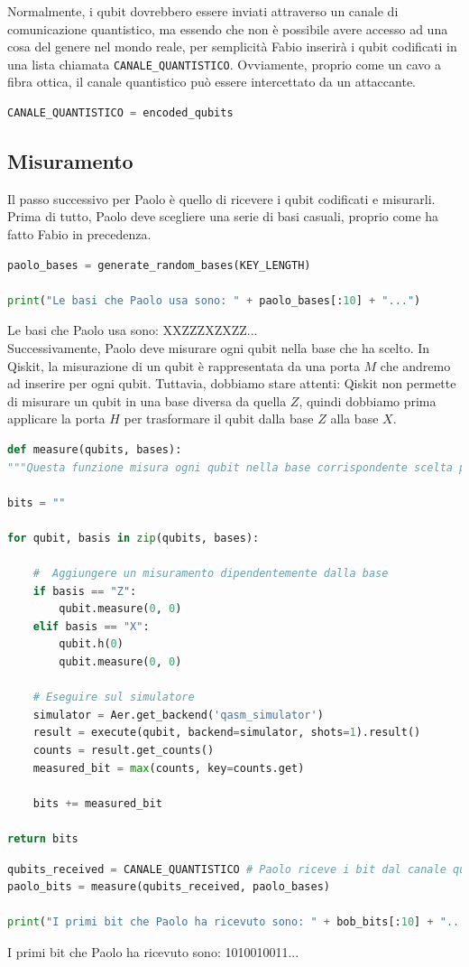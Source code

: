 \documentclass[a4paper]{article}
\begin{document}
Normalmente, i qubit dovrebbero essere inviati attraverso un canale di comunicazione
quantistico, ma essendo che non è possibile avere accesso ad una cosa del genere nel mondo reale,
per semplicità Fabio inserirà i qubit codificati in una lista chiamata \texttt{CANALE\_QUANTISTICO}.
Ovviamente, proprio come un cavo a fibra ottica, il canale quantistico può essere intercettato
da un attaccante.
\begin{lstlisting}[language=Python]
CANALE_QUANTISTICO = encoded_qubits 
\end{lstlisting}

\subsection{Misuramento}

Il passo successivo per Paolo è quello di ricevere i qubit codificati e misurarli.
Prima di tutto, Paolo deve scegliere una serie di basi casuali, proprio come ha fatto Fabio in precedenza.
\begin{lstlisting}[language=Python]
paolo_bases = generate_random_bases(KEY_LENGTH)

print("Le basi che Paolo usa sono: " + paolo_bases[:10] + "...")
\end{lstlisting}
Le basi che Paolo usa sono: XXZZZXZXZZ...\\
Successivamente, Paolo deve misurare ogni qubit nella base che ha scelto.
In Qiskit, la misurazione di un qubit è rappresentata da una porta \( M \) che
andremo ad inserire per ogni qubit. Tuttavia, dobbiamo stare attenti:
Qiskit non permette di misurare un qubit in una base diversa da quella \( Z \), quindi
dobbiamo prima applicare la porta \( H \) per trasformare il qubit dalla base \( Z \) alla
base \( X \).
\begin{lstlisting}[language=Python]
def measure(qubits, bases):
"""Questa funzione misura ogni qubit nella base corrispondente scelta per esso."""

bits = "" 

for qubit, basis in zip(qubits, bases):

    #  Aggiungere un misuramento dipendentemente dalla base
    if basis == "Z":
        qubit.measure(0, 0)
    elif basis == "X":
        qubit.h(0)
        qubit.measure(0, 0)

    # Eseguire sul simulatore
    simulator = Aer.get_backend('qasm_simulator')
    result = execute(qubit, backend=simulator, shots=1).result()
    counts = result.get_counts()
    measured_bit = max(counts, key=counts.get) 

    bits += measured_bit
    
return bits
\end{lstlisting}
\begin{lstlisting}[language=Python]
qubits_received = CANALE_QUANTISTICO # Paolo riceve i bit dal canale quantistico
paolo_bits = measure(qubits_received, paolo_bases)

print("I primi bit che Paolo ha ricevuto sono: " + bob_bits[:10] + "...")  
\end{lstlisting}
I primi bit che Paolo ha ricevuto sono: 1010010011...
\end{document}
